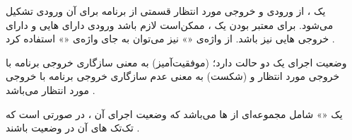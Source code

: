 
یک ، از ورودی و خروجی مورد انتظار قسمتی از برنامه برای
آن ورودی تشکیل می‌شود. برای معتبر بودن یک ، ممکن‌است لازم
باشد ورودی دارای ‌هایی و دارای خروجی
‌هایی نیز باشد. از واژه‌ی «» نیز می‌توان به
جای واژه‌ی «» استفاده کرد .

وضعیت اجرای یک  دو حالت دارد؛  (موفقیت‌آمیز) به
معنی سازگاری خروجی برنامه با خروجی مورد انتظار و  (شکست) به
معنی عدم سازگاری خروجی برنامه با خروجی مورد انتظار می‌باشد
.

یک «» شامل مجموعه‌ای از ‌ها می‌باشد که وضعیت
اجرای آن ، در صورتی  است که تک‌تک
‌های آن در وضعیت  باشند .


